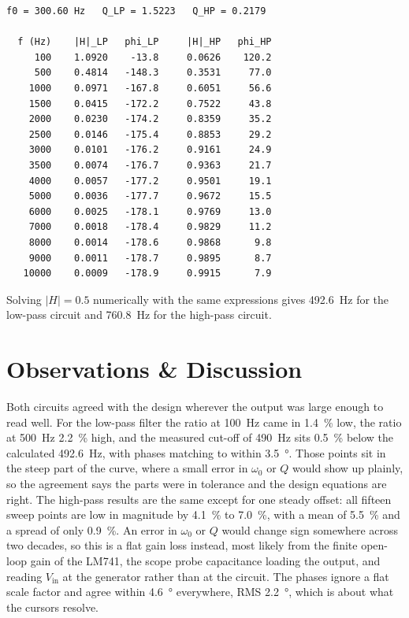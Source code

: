 \documentclass[11pt]{article}
\begin{document}
\begin{lstlisting}[style=console, caption={SciLab runtime output.}]
f0 = 300.60 Hz   Q_LP = 1.5223   Q_HP = 0.2179

  f (Hz)    |H|_LP   phi_LP     |H|_HP   phi_HP
     100    1.0920    -13.8     0.0626    120.2
     500    0.4814   -148.3     0.3531     77.0
    1000    0.0971   -167.8     0.6051     56.6
    1500    0.0415   -172.2     0.7522     43.8
    2000    0.0230   -174.2     0.8359     35.2
    2500    0.0146   -175.4     0.8853     29.2
    3000    0.0101   -176.2     0.9161     24.9
    3500    0.0074   -176.7     0.9363     21.7
    4000    0.0057   -177.2     0.9501     19.1
    5000    0.0036   -177.7     0.9672     15.5
    6000    0.0025   -178.1     0.9769     13.0
    7000    0.0018   -178.4     0.9829     11.2
    8000    0.0014   -178.6     0.9868      9.8
    9000    0.0011   -178.7     0.9895      8.7
   10000    0.0009   -178.9     0.9915      7.9
\end{lstlisting}

Solving $|H| = 0.5$ numerically with the same expressions gives
\qty{492.6}{\hertz} for the low-pass circuit and \qty{760.8}{\hertz} for the
high-pass circuit.

\section*{Observations \& Discussion}
Both circuits agreed with the design wherever the output was large enough to read
well. For the low-pass filter the ratio at \qty{100}{\hertz} came in
\qty{1.4}{\percent} low, the ratio at \qty{500}{\hertz} \qty{2.2}{\percent} high,
and the measured cut-off of \qty{490}{\hertz} sits \qty{0.5}{\percent} below the
calculated \qty{492.6}{\hertz}, with phases matching to within
\qty{3.5}{\degree}. Those points sit in the steep part of the curve, where a small
error in $\omega_0$ or $Q$ would show up plainly, so the agreement says the parts
were in tolerance and the design equations are right. The high-pass results are
the same except for one steady offset: all fifteen sweep points are low in
magnitude by \qty{4.1}{\percent} to \qty{7.0}{\percent}, with a mean of
\qty{5.5}{\percent} and a spread of only \qty{0.9}{\percent}. An error in
$\omega_0$ or $Q$ would change sign somewhere across two decades, so this is a
flat gain loss instead, most likely from the finite open-loop gain of the LM741,
the scope probe capacitance loading the output, and reading $V_{\text{in}}$ at the
generator rather than at the circuit. The phases ignore a flat scale factor and
agree within \qty{4.6}{\degree} everywhere, RMS \qty{2.2}{\degree}, which is about
what the cursors resolve.
\end{document}
